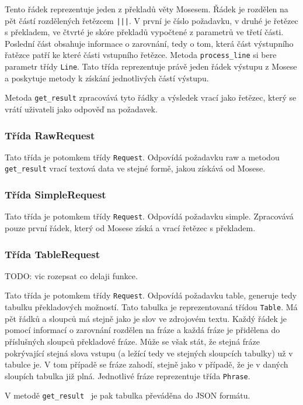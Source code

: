 \documentclass[12pt,a4paper]{report}
\begin{document}
Tento řádek reprezentuje jeden z překladů věty Mosesem. Řádek je rozdělen na pět částí rozdělených řetězcem {\tt |||}. V první je číslo požadavku, v druhé je řetězec s překladem, ve čtvrté je skóre překladů vypočtené z parametrů ve třetí části. Poslední část obsahuje informace o zarovnání, tedy o tom, která část výstupního řatězce patří ke které části vstupního řetězce. Metoda {\tt process\_line} si bere parametr třídy {\tt Line}. Tato třída reprezentuje právě jeden řádek výstupu z Mosese a poskytuje metody k získání jednotlivých částí výstupu.

Metoda {\tt get\_result} zpracovává tyto řádky a výsledek vrací jako řetězec, který se vrátí uživateli jako odpověď na požadavek.

\subsubsection{Třída RawRequest}
Tato třída je potomkem třídy {\tt Request}. Odpovídá požadavku raw a metodou {\tt get\_result} vrací textová data ve stejné formě, jakou získává od Mosese.

\subsubsection{Třída SimpleRequest}
Tato třída je potomkem třídy {\tt Request}. Odpovídá požadavku simple. Zpracovává pouze první řádek, který od Mosese získá a vrací řetězec s překladem.

\subsubsection{Třída TableRequest}
TODO: vic rozepsat co delaji funkce.

Tato třída je potomkem třídy {\tt Request}. Odpovídá požadavku table, generuje tedy tabulku překladových možností. Tato tabulka je reprezentovaná třídou {\tt Table}. Má pět řádků a sloupců má stejně jako je slov ve zdrojovém textu. Každý řádek je pomocí informací o zarovnání rozdělen na fráze a každá fráze je přidělena do příslušných sloupců překladové fráze. Může se však stát, že stejná fráze pokrývající stejná slova vstupu (a ležící tedy ve stejných sloupcích tabulky) už v tabulce je. V tom případě se fráze zahodí, stejně jako v případě, že je v daných sloupích tabulka již plná. Jednotlivé fráze reprezentuje třída {\tt Phrase}.

V metodě {\tt get\_result } je pak tabulka převáděna do JSON formátu.
\end{document}

